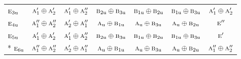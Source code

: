 \documentclass[10pt,a4paper]{article}
\numberwithin{equation}{section}
\newcommand{\irr}[1]{\text{\normalfont\scshape #1}}
\newcommand{\ptag}[1]{\mathrm{#1}}
\begin{document}
{\begin{longtable}{@{}lcccccc@{}}
$\irr{e}_{3\ptag{u}}$ & $\irr{a}_{1}'\oplus \irr{a}_{2}'$ & $\irr{a}_{1}'\oplus \irr{a}_{2}''$ & $\irr{b}_{2\ptag{u}}\oplus \irr{b}_{3\ptag{u}}$ & $\irr{b}_{1\ptag{u}}\oplus \irr{b}_{2\ptag{u}}$ & $\irr{b}_{1\ptag{u}}\oplus \irr{b}_{3\ptag{u}}$ & $\irr{a}_{1}'\oplus \irr{a}_{2}'$\\
$\irr{e}_{4\ptag{u}}$ & $\irr{a}_{1}''\oplus \irr{a}_{2}''$ & $\irr{a}_{2}'\oplus \irr{a}_{1}''$ & $\irr{a}_{\ptag{u}}\oplus \irr{b}_{1\ptag{u}}$ & $\irr{a}_{\ptag{u}}\oplus \irr{b}_{3\ptag{u}}$ & $\irr{a}_{\ptag{u}}\oplus \irr{b}_{2\ptag{u}}$ & $\irr{e}''$\\
$\irr{e}_{5\ptag{u}}$ & $\irr{a}_{1}'\oplus \irr{a}_{2}'$ & $\irr{a}_{1}'\oplus \irr{a}_{2}''$ & $\irr{b}_{2\ptag{u}}\oplus \irr{b}_{3\ptag{u}}$ & $\irr{b}_{1\ptag{u}}\oplus \irr{b}_{2\ptag{u}}$ & $\irr{b}_{1\ptag{u}}\oplus \irr{b}_{3\ptag{u}}$ & $\irr{e}'$\\*
$\irr{e}_{6\ptag{u}}$ & $\irr{a}_{1}''\oplus \irr{a}_{2}''$ & $\irr{a}_{2}'\oplus \irr{a}_{1}''$ & $\irr{a}_{\ptag{u}}\oplus \irr{b}_{1\ptag{u}}$ & $\irr{a}_{\ptag{u}}\oplus \irr{b}_{3\ptag{u}}$ & $\irr{a}_{\ptag{u}}\oplus \irr{b}_{2\ptag{u}}$ & $\irr{a}_{1}''\oplus \irr{a}_{2}''$\\
\bottomrule\end{longtable}}
\end{document}
